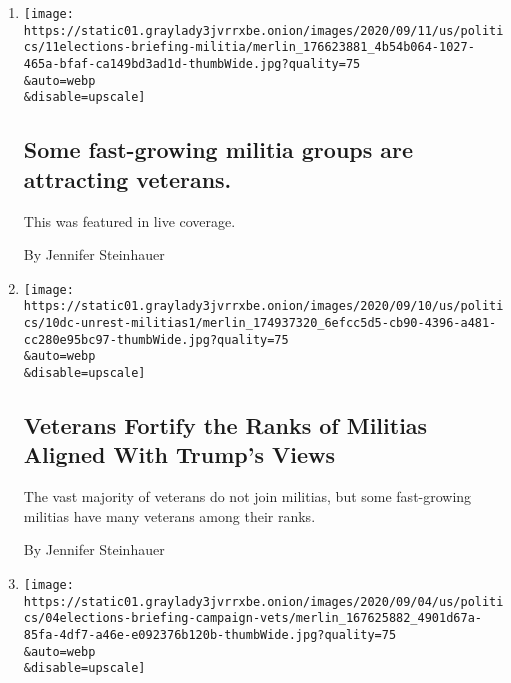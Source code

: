\begin{enumerate}
\def\labelenumi{\arabic{enumi}.}
\item
  \href{/live/2020/09/11/us/trump-vs-biden/some-fast-growing-militia-groups-are-attracting-veterans}{}

  \texttt{[image: https://static01.graylady3jvrrxbe.onion/images/2020/09/11/us/politics/11elections-briefing-militia/merlin\_176623881\_4b54b064-1027-465a-bfaf-ca149bd3ad1d-thumbWide.jpg?quality=75\\\&auto=webp\\\&disable=upscale]}

  \hypertarget{some-fast-growing-militia-groups-are-attracting-veterans}{%
  \subsection{Some fast-growing militia groups are attracting
  veterans.}\label{some-fast-growing-militia-groups-are-attracting-veterans}}

  This was featured in live coverage.

  By Jennifer Steinhauer
\item
  \href{/2020/09/11/us/politics/veterans-trump-protests-militias.html}{}

  \texttt{[image: https://static01.graylady3jvrrxbe.onion/images/2020/09/10/us/politics/10dc-unrest-militias1/merlin\_174937320\_6efcc5d5-cb90-4396-a481-cc280e95bc97-thumbWide.jpg?quality=75\\\&auto=webp\\\&disable=upscale]}

  \hypertarget{veterans-fortify-the-ranks-of-militias-aligned-with-trumps-views}{%
  \subsection{Veterans Fortify the Ranks of Militias Aligned With
  Trump's
  Views}\label{veterans-fortify-the-ranks-of-militias-aligned-with-trumps-views}}

  The vast majority of veterans do not join militias, but some
  fast-growing militias have many veterans among their ranks.

  By Jennifer Steinhauer
\item
  \href{/live/2020/09/04/us/trump-vs-biden/democrats-see-an-opening-for-winning-over-military-voters}{}

  \texttt{[image: https://static01.graylady3jvrrxbe.onion/images/2020/09/04/us/politics/04elections-briefing-campaign-vets/merlin\_167625882\_4901d67a-85fa-4df7-a46e-e092376b120b-thumbWide.jpg?quality=75\\\&auto=webp\\\&disable=upscale]}

  \hypertarget{democrats-see-an-opening-for-winning-over-military-voters}{%
}
\end{enumerate}
